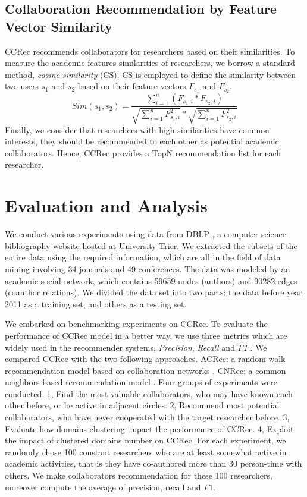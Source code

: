 \documentclass[review]{elsarticle}
\begin{document}
\subsection{Collaboration Recommendation by Feature Vector Similarity}
CCRec recommends collaborators for researchers based on their similarities. To measure the academic features similarities of researchers, we borrow a standard method, \emph{cosine similarity} (CS). CS is employed to define the similarity between two users $s_{1}$ and $s_{2}$ based on their feature vectors $F_{s_{1}}$ and $F_{s_{2}}$.
\begin{equation}
Sim(s_{1},s_{2})=\frac{\sum_{i=1}^{n}(F_{s_{1},i}*F_{s_{2},i})}{\sqrt{\sum_{i=1}^{n}F_{s_{1},i}^2}*\sqrt{\sum_{i=1}^{n}F_{s_{2},i}^2}}
\end{equation}
Finally, we consider that researchers with high similarities have common interests, they should be recommended to each other as potential academic collaborators. Hence, CCRec provides a TopN recommendation list for each researcher.

\section{Evaluation and Analysis}
We conduct various experiments using data from DBLP \cite{Ley:DBLP}, a computer science bibliography website hosted at University Trier. We extracted the subsets of the entire data using the required information, which are all in the field of data mining involving 34 journals and 49 conferences. The data was modeled by an academic social network, which contains 59659 nodes (authors) and 90282 edges (coauthor relations). We divided the data set into two parts: the data before year 2011 as a training set, and others as a testing set.

We embarked on benchmarking experiments on CCRec. To evaluate the performance of CCRec model in a better way, we use three metrics which are widely used in the recommender systems, \emph{Precision}, \emph{Recall} and \emph{F1} \cite{shani2011evaluating}. We compared CCRec with the two following approaches. ACRec: a random walk recommendation model based on collaboration networks \cite{li2014acrec}. CNRec: a common neighbors based recommendation model \cite{lopes2010collaboration}. Four groups of experiments were conducted. 1, Find the most valuable collaborators, who may have known each other before, or be active in adjacent circles. 2, Recommend most potential collaborators, who have never cooperated with the target researcher before. 3, Evaluate how domains clustering impact the performance of CCRec. 4, Exploit the impact of clustered domains number on CCRec. For each experiment, we randomly chose 100 constant researchers who are at least somewhat active in academic activities, that is they have co-authored more than 30 person-time with others. We make collaborators recommendation for these 100 researchers, moreover compute the average of precision, recall and $F1$.
\end{document}
